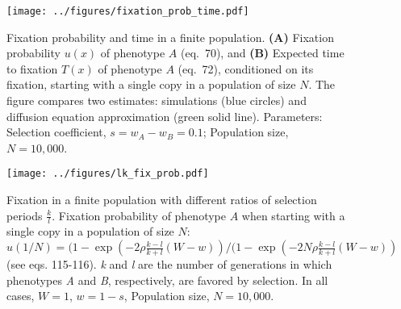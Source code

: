 \documentclass[]{article}
\begin{document}
\begin{figure}
\centering
\texttt{[image: ../figures/fixation\_prob\_time.pdf]}
\caption{Fixation probability and time in a finite population.
\textbf{(A)} Fixation probability \(u(x)\) of phenotype \(A\) (eq.\ 70), and \textbf{(B)}
Expected time to fixation \(T(x)\) of phenotype \(A\) (eq.\ 72), conditioned on its
fixation, starting with a single copy in a population of size \(N\). The
figure compares two estimates: simulations (blue circles) and diffusion
equation approximation (green solid line). Parameters: Selection coefficient, \(s=w_A-w_B=0.1\);
Population size, \(N=10,000\).}\label{fixation_prob_time}
\end{figure}

\begin{figure}
\centering
\texttt{[image: ../figures/lk\_fix\_prob.pdf]}
\caption{Fixation in a finite population with different ratios of selection periods \(\frac{k}{l}\). Fixation probability of phenotype $A$ when starting with a single copy in a population of size $N$: $u(1/N) = (1-\exp(-2 \rho \frac{k-l}{k+l}(W-w))/(1-\exp(-2 N \rho \frac{k-l}{k+l}(W-w))$ (see eqs. 115-116).
\emph{k} and \emph{l} are the number of
generations in which phenotypes \emph{A} and \emph{B}, respectively, are favored by
selection. In all cases, $W = 1$, $w = 1-s$, Population size, \(N=10,000\).} \label{lk_fix_prob}
\end{figure}
\end{document}
